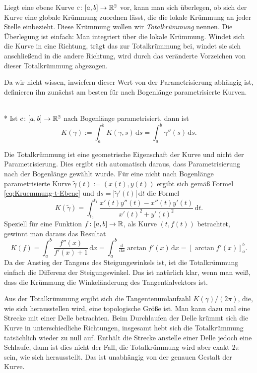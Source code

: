 Liegt eine ebene Kurve $c\colon[a,b]\to\mathbb R^2$ vor, kann man sich
überlegen, ob sich der Kurve eine globale Krümmung zuordnen lässt,
die die lokale Krümmung an jeder Stelle einbezieht. Diese Krümmung
wollen wir \emph{Totalkrümmung} nennen. Die Überlegung
ist einfach: Man integriert über die lokale Krümmung. Windet sich
die Kurve in eine Richtung, trägt das zur Totalkrümmung bei, windet sie
sich anschließend in die andere Richtung, wird durch das veränderte
Vorzeichen von dieser Totalkrümmung abgezogen.

Da wir nicht wissen, inwiefern dieser Wert von der Parametrisierung
abhängig ist, definieren ihn zunächst am besten für nach Bogenlänge
parametrisierte Kurven.

\begin{definition}[Totalkrümmung]\mbox{}\\*
Ist $c\colon [a,b]\to\mathbb R^2$ nach Bogenlänge parametrisiert, dann ist
\begin{equation}
K(\gamma) := \int_a^b K(\gamma,s)\,\mathrm ds
= \int_a^b \gamma''(s)\,\mathrm ds.
\end{equation}
\end{definition}
Die Totalkrümmung ist eine geometrische Eigenschaft der Kurve
und nicht der Parametrisierung. Dies ergibt sich automatisch
daraus, dass Parametrisierung nach der Bogenlänge gewählt wurde.
Für eine nicht nach Bogenlänge parametrisierte Kurve
$\tilde \gamma(t) := (x(t),y(t))$ ergibt sich gemäß Formel
\eqref{eq:Kruemmung-t-Ebene} und
$\mathrm ds = |\tilde \gamma'(t)|\,\mathrm dt$
die Formel
\begin{equation}
K(\tilde\gamma) = \int_{t_0}^{t_1}
\frac{x'(t)y''(t)-x''(t)y'(t)}{x'(t)^2+y'(t)^2}\,\mathrm dt.
\end{equation}
Speziell für eine Funktion $f\colon [a,b]\to\mathbb R$, als Kurve
$(t,f(t))$ betrachtet, gewinnt man daraus das Resultat
\begin{equation}
K(f) = \int_a^b \frac{f''(x)}{f'(x)+1}\,\mathrm dx
= \int_a^b \tfrac{\mathrm d}{\mathrm dx}\arctan f'(x)\,\mathrm dx
= [\arctan f'(x)]_a^b.
\end{equation}
Da der Anstieg der Tangens des Steigungswinkels ist, ist die
Totalkrümmung einfach die Differenz der Steigungswinkel.
Das ist natürlich klar, wenn man weiß, dass die Krümmung
die Winkeländerung des Tangentialvektors ist.

Aus der Totalkrümmung ergibt sich die Tangentenumlaufzahl
$K(\gamma)/(2\pi)$, die, wie sich herausstellen wird, eine topologische
Größe ist. Man kann dazu mal eine Strecke mit einer Delle
betrachten. Beim Durchlaufen der Delle krümmt sich die Kurve
in unterschiedliche Richtungen, insgesamt hebt sich die Totalkrümmung
tatsächlich wieder zu null auf. Enthält die Strecke anstelle
einer Delle jedoch eine Schlaufe, dann ist dies nicht der
Fall, die Totalkrümmung wird aber exakt $2\pi$ sein, wie sich
herausstellt. Das ist unabhängig von der genauen Gestalt der Kurve.

